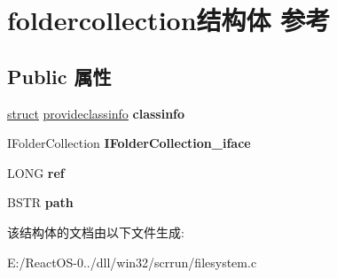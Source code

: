 \hypertarget{structfoldercollection}{}\section{foldercollection结构体 参考}
\label{structfoldercollection}
\subsection*{Public 属性}
\begin{DoxyCompactItemize}
\item 
\mbox{\label{structfoldercollection_a8d5c40fbb67266cd315ed05764511ef8}} 
\hyperlink{interfacestruct}{struct} \hyperlink{structprovideclassinfo}{provideclassinfo} {\bfseries classinfo}
\item 
\mbox{\label{structfoldercollection_a65f1eb33d4bdbfc71c94be8733392af5}} 
I\+Folder\+Collection {\bfseries I\+Folder\+Collection\+\_\+iface}
\item 
\mbox{\label{structfoldercollection_a1227985fdc10146113202ef0b9f25ad6}} 
L\+O\+NG {\bfseries ref}
\item 
\mbox{\label{structfoldercollection_ad7e2cad8c6b48f2ac302ecfee8369da8}} 
B\+S\+TR {\bfseries path}
\end{DoxyCompactItemize}


该结构体的文档由以下文件生成\+:\begin{DoxyCompactItemize}
\item 
E\+:/\+React\+O\+S-\/0../dll/win32/scrrun/filesystem.\+c\end{DoxyCompactItemize}
